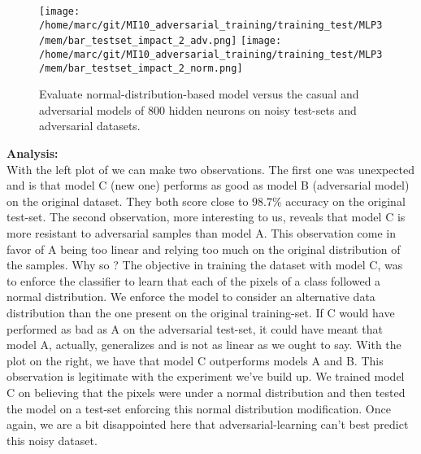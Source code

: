 			\begin{figure}
				\centering
				\texttt{[image: /home/marc/git/MI10\_adversarial\_training/training\_test/MLP3/mem/bar\_testset\_impact\_2\_adv.png]}
				\texttt{[image: /home/marc/git/MI10\_adversarial\_training/training\_test/MLP3/mem/bar\_testset\_impact\_2\_norm.png]}
				\caption{Evaluate normal-distribution-based model versus the casual and adversarial models of 800 hidden neurons on noisy test-sets and adversarial datasets.}
				\label{fig:mnist_noisy_learn}
			\end{figure}

			\vskip 1cm
			\textbf{Analysis:}\\
			With the left plot of  we can make two observations. The first one was unexpected and is that model C (new one) performs as good as model B (adversarial model) on the original dataset. They both score close to $98.7\%$ accuracy on the original test-set. The second observation, more interesting to us, reveals that model C is more resistant to adversarial samples than model A. This observation come in favor of A being too linear and relying too much on the original distribution of the samples. Why so ? The objective in training the dataset with model C, was to enforce the classifier to learn that each of the pixels of a class followed a normal distribution. We enforce the model to consider an alternative data distribution than the one present on the original training-set. If C would have performed as bad as A on the adversarial test-set, it could have meant that model A, actually, generalizes and is not as linear as we ought to say.
			With the plot on the right, we have that model C outperforms models A and B. This observation is legitimate with the experiment we've build up. We trained model C on believing that the pixels were under a normal distribution and then tested the model on a test-set enforcing this normal distribution modification. Once again, we are a bit disappointed here that adversarial-learning can't best predict this noisy dataset.

			
